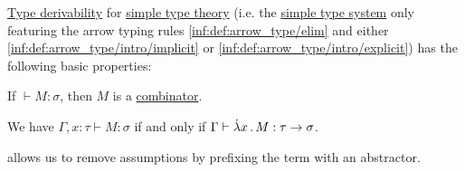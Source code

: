 \begin{proposition}\label{thm:def:simple_type_derivability}
  \hyperref[def:simple_type_derivability]{Type derivability} for \hyperref[con:simple_type_theory/arrow]{simple type theory} (i.e. the \hyperref[def:simple_type_system]{simple type system} only featuring the arrow typing rules \ref{inf:def:arrow_type/elim} and either \ref{inf:def:arrow_type/intro/implicit} or \ref{inf:def:arrow_type/intro/explicit}) has the following basic properties:
  \begin{thmenum}
     If \( \vdash M: \sigma \), then \( M \) is a \hyperref[def:lambda_combinator]{combinator}.

     We have \( \Gamma, x: \tau \vdash M: \sigma \) if and only if \( \Gamma \vdash \qabs x M: \tau \to \sigma \).
  \end{thmenum}
\end{proposition}
\begin{comments}
  \item {} allows us to remove assumptions by prefixing the term with an abstractor.
\end{comments}
